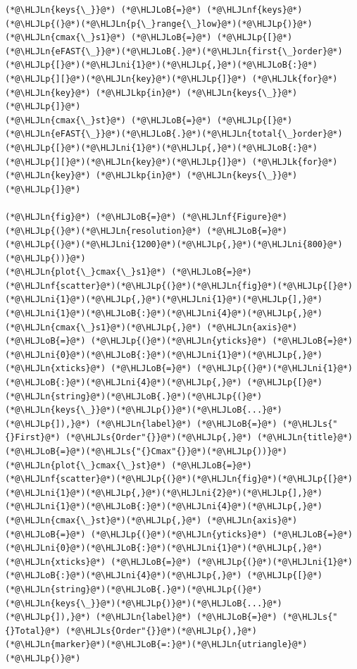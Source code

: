 \documentclass[12pt,a4paper]{article}
\newcommand{\HLJLk}[1]{\textcolor[RGB]{148,91,176}{\textbf{#1}}}
\newcommand{\HLJLkp}[1]{\textcolor[RGB]{148,91,176}{\textbf{#1}}}
\newcommand{\HLJLn}[1]{#1}
\newcommand{\HLJLnf}[1]{\textcolor[RGB]{66,102,213}{#1}}
\newcommand{\HLJLs}[1]{\textcolor[RGB]{201,61,57}{#1}}
\newcommand{\HLJLni}[1]{\textcolor[RGB]{59,151,46}{#1}}
\newcommand{\HLJLoB}[1]{\textcolor[RGB]{102,102,102}{\textbf{#1}}}
\newcommand{\HLJLp}[1]{#1}
\begin{document}
\begin{lstlisting}
(*@\HLJLn{keys{\_}}@*) (*@\HLJLoB{=}@*) (*@\HLJLnf{keys}@*)(*@\HLJLp{(}@*)(*@\HLJLn{p{\_}range{\_}low}@*)(*@\HLJLp{)}@*)
(*@\HLJLn{cmax{\_}s1}@*) (*@\HLJLoB{=}@*) (*@\HLJLp{[}@*)(*@\HLJLn{eFAST{\_}}@*)(*@\HLJLoB{.}@*)(*@\HLJLn{first{\_}order}@*)(*@\HLJLp{[}@*)(*@\HLJLni{1}@*)(*@\HLJLp{,}@*)(*@\HLJLoB{:}@*)(*@\HLJLp{][}@*)(*@\HLJLn{key}@*)(*@\HLJLp{]}@*) (*@\HLJLk{for}@*) (*@\HLJLn{key}@*) (*@\HLJLkp{in}@*) (*@\HLJLn{keys{\_}}@*)(*@\HLJLp{]}@*)
(*@\HLJLn{cmax{\_}st}@*) (*@\HLJLoB{=}@*) (*@\HLJLp{[}@*)(*@\HLJLn{eFAST{\_}}@*)(*@\HLJLoB{.}@*)(*@\HLJLn{total{\_}order}@*)(*@\HLJLp{[}@*)(*@\HLJLni{1}@*)(*@\HLJLp{,}@*)(*@\HLJLoB{:}@*)(*@\HLJLp{][}@*)(*@\HLJLn{key}@*)(*@\HLJLp{]}@*) (*@\HLJLk{for}@*) (*@\HLJLn{key}@*) (*@\HLJLkp{in}@*) (*@\HLJLn{keys{\_}}@*)(*@\HLJLp{]}@*)

(*@\HLJLn{fig}@*) (*@\HLJLoB{=}@*) (*@\HLJLnf{Figure}@*)(*@\HLJLp{(}@*)(*@\HLJLn{resolution}@*) (*@\HLJLoB{=}@*) (*@\HLJLp{(}@*)(*@\HLJLni{1200}@*)(*@\HLJLp{,}@*)(*@\HLJLni{800}@*)(*@\HLJLp{))}@*)
(*@\HLJLn{plot{\_}cmax{\_}s1}@*) (*@\HLJLoB{=}@*) (*@\HLJLnf{scatter}@*)(*@\HLJLp{(}@*)(*@\HLJLn{fig}@*)(*@\HLJLp{[}@*)(*@\HLJLni{1}@*)(*@\HLJLp{,}@*)(*@\HLJLni{1}@*)(*@\HLJLp{],}@*) (*@\HLJLni{1}@*)(*@\HLJLoB{:}@*)(*@\HLJLni{4}@*)(*@\HLJLp{,}@*) (*@\HLJLn{cmax{\_}s1}@*)(*@\HLJLp{,}@*) (*@\HLJLn{axis}@*) (*@\HLJLoB{=}@*) (*@\HLJLp{(}@*)(*@\HLJLn{yticks}@*) (*@\HLJLoB{=}@*) (*@\HLJLni{0}@*)(*@\HLJLoB{:}@*)(*@\HLJLni{1}@*)(*@\HLJLp{,}@*) (*@\HLJLn{xticks}@*) (*@\HLJLoB{=}@*) (*@\HLJLp{(}@*)(*@\HLJLni{1}@*)(*@\HLJLoB{:}@*)(*@\HLJLni{4}@*)(*@\HLJLp{,}@*) (*@\HLJLp{[}@*)(*@\HLJLn{string}@*)(*@\HLJLoB{.}@*)(*@\HLJLp{(}@*)(*@\HLJLn{keys{\_}}@*)(*@\HLJLp{)}@*)(*@\HLJLoB{...}@*)(*@\HLJLp{]),}@*) (*@\HLJLn{label}@*) (*@\HLJLoB{=}@*) (*@\HLJLs{"{}First}@*) (*@\HLJLs{Order"{}}@*)(*@\HLJLp{,}@*) (*@\HLJLn{title}@*)(*@\HLJLoB{=}@*)(*@\HLJLs{"{}Cmax"{}}@*)(*@\HLJLp{))}@*)
(*@\HLJLn{plot{\_}cmax{\_}st}@*) (*@\HLJLoB{=}@*) (*@\HLJLnf{scatter}@*)(*@\HLJLp{(}@*)(*@\HLJLn{fig}@*)(*@\HLJLp{[}@*)(*@\HLJLni{1}@*)(*@\HLJLp{,}@*)(*@\HLJLni{2}@*)(*@\HLJLp{],}@*) (*@\HLJLni{1}@*)(*@\HLJLoB{:}@*)(*@\HLJLni{4}@*)(*@\HLJLp{,}@*) (*@\HLJLn{cmax{\_}st}@*)(*@\HLJLp{,}@*) (*@\HLJLn{axis}@*) (*@\HLJLoB{=}@*) (*@\HLJLp{(}@*)(*@\HLJLn{yticks}@*) (*@\HLJLoB{=}@*) (*@\HLJLni{0}@*)(*@\HLJLoB{:}@*)(*@\HLJLni{1}@*)(*@\HLJLp{,}@*) (*@\HLJLn{xticks}@*) (*@\HLJLoB{=}@*) (*@\HLJLp{(}@*)(*@\HLJLni{1}@*)(*@\HLJLoB{:}@*)(*@\HLJLni{4}@*)(*@\HLJLp{,}@*) (*@\HLJLp{[}@*)(*@\HLJLn{string}@*)(*@\HLJLoB{.}@*)(*@\HLJLp{(}@*)(*@\HLJLn{keys{\_}}@*)(*@\HLJLp{)}@*)(*@\HLJLoB{...}@*)(*@\HLJLp{]),}@*) (*@\HLJLn{label}@*) (*@\HLJLoB{=}@*) (*@\HLJLs{"{}Total}@*) (*@\HLJLs{Order"{}}@*)(*@\HLJLp{),}@*) (*@\HLJLn{marker}@*)(*@\HLJLoB{=:}@*)(*@\HLJLn{utriangle}@*)(*@\HLJLp{)}@*)


\end{lstlisting}
\end{document}
